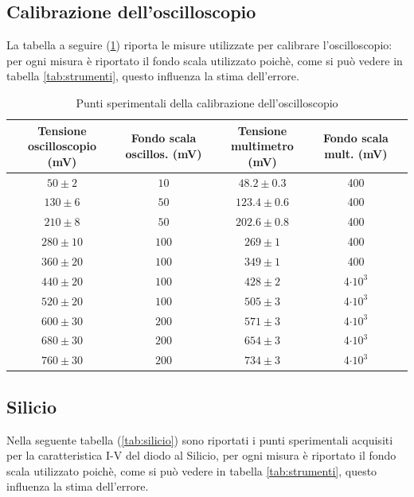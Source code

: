 \documentclass[]{article}
\begin{document}
\subsection{Calibrazione dell'oscilloscopio}
La tabella a seguire (\ref{tab:calibrazione}) riporta le misure utilizzate per calibrare l'oscilloscopio: per ogni misura è riportato il fondo scala utilizzato poichè, come si può vedere in tabella \ref{tab:strumenti}, questo influenza la stima dell'errore. 
	\begin{table}[H]
		\centering
	\begin{tabular}{|c|c|c|c|c|}
		\hline
		Tensione oscilloscopio (mV)& Fondo scala oscillos. (mV) & Tensione multimetro (mV) & Fondo scala mult. (mV) \\
		\hline
		$ 50\pm 2 $ &$ 10 $ & $ 48.2\pm 0.3 $ &400\\
		\hline
		$ 130\pm 6$ &$ 50 $ & $ 123.4\pm 0.6 $ &400\\
		\hline
		$ 210\pm 8 $ &$ 50 $ & $ 202.6\pm 0.8 $ &400\\
		\hline
		$ 280\pm 10$ &$ 100 $ & $ 269\pm 1 $ &400\\
		\hline
		$ 360\pm 20 $ &$ 100 $ & $ 349\pm 1 $ &400\\
		\hline
		$ 440\pm 20 $ &$ 100 $ & $ 428\pm 2 $ &4$\cdot10^3$\\
		\hline
		$ 520\pm 20 $ &$ 100 $ & $ 505\pm 3 $ &4$\cdot10^3$\\
		\hline
		$ 600\pm 30 $ &$ 200 $ & $ 571\pm 3 $ &4$\cdot10^3$\\
		\hline
		$ 680\pm 30 $ &$ 200 $ & $ 654\pm 3 $&4$\cdot10^3$ \\
		\hline
		$ 760\pm 30 $ &$ 200 $ & $ 734\pm 3 $&4$\cdot10^3$ \\
		\hline
		
	\end{tabular}
\caption{Punti sperimentali della calibrazione dell'oscilloscopio}
\label{tab:calibrazione}
\end{table}

\pagebreak
\subsection{Silicio}
Nella seguente tabella (\ref{tab:silicio}) sono riportati i punti sperimentali acquisiti per la caratteristica I-V del diodo al Silicio, per ogni misura è riportato il fondo scala utilizzato poichè, come si può vedere in tabella \ref{tab:strumenti}, questo influenza la stima dell'errore.
\end{document}
